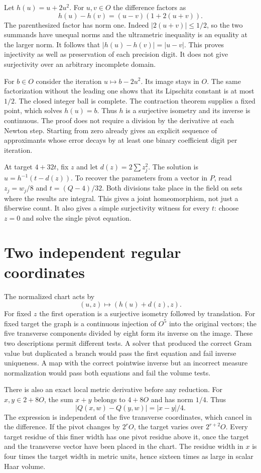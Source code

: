 \documentclass[12pt,letterpaper]{article}
\begin{document}
Let $h(u)=u+2u^2$. For $u,v\in O$ the difference factors as
\[
          h(u)-h(v)=(u-v)(1+2(u+v)).
\]
The parenthesized factor has norm one. Indeed $|2(u+v)|\le1/2$, so the two summands have unequal norms and the ultrametric inequality is an equality at the larger norm. It follows that $|h(u)-h(v)|=|u-v|$. This proves injectivity as well as preservation of each precision digit. It does not give surjectivity over an arbitrary incomplete domain.

For $b\in O$ consider the iteration $u\mapsto b-2u^2$. Its image stays in $O$. The same factorization without the leading one shows that its Lipschitz constant is at most $1/2$. The closed integer ball is complete. The contraction theorem supplies a fixed point, which solves $h(u)=b$. Thus $h$ is a surjective isometry and its inverse is continuous. The proof does not require a division by the derivative at each Newton step. Starting from zero already gives an explicit sequence of approximants whose error decays by at least one binary coefficient digit per iteration.

At target $4+32t$, fix $z$ and let $d(z)=2\sum z_j^2$. The solution is $u=h^{-1}(t-d(z))$. To recover the parameters from a vector in $P$, read $z_j=w_j/8$ and $t=(Q-4)/32$. Both divisions take place in the field on sets where the results are integral. This gives a joint homeomorphism, not just a fiberwise count. It also gives a simple surjectivity witness for every $t$: choose $z=0$ and solve the single pivot equation.

\section{Two independent regular coordinates}
The normalized chart acts by
\[
 (u,z)\longmapsto(h(u)+d(z),z).
\]
For fixed $z$ the first operation is a surjective isometry followed by translation. For fixed target the graph is a continuous injection of $O^5$ into the original vectors; the five transverse components divided by eight form its inverse on the image. These two descriptions permit different tests. A solver that produced the correct Gram value but duplicated a branch would pass the first equation and fail inverse uniqueness. A map with the correct pointwise inverse but an incorrect measure normalization would pass both equations and fail the volume tests.

There is also an exact local metric derivative before any reduction. For $x,y\in2+8O$, the sum $x+y$ belongs to $4+8O$ and has norm $1/4$. Thus
\[
          |Q(x,w)-Q(y,w)|=|x-y|/4 .
\]
The expression is independent of the five transverse coordinates, which cancel in the difference. If the pivot changes by $2^r O$, the target varies over $2^{r+2}O$. Every target residue of this finer width has one pivot residue above it, once the target and the transverse vector have been placed in the chart. The residue width in $x$ is four times the target width in metric units, hence sixteen times as large in scalar Haar volume.
\end{document}
